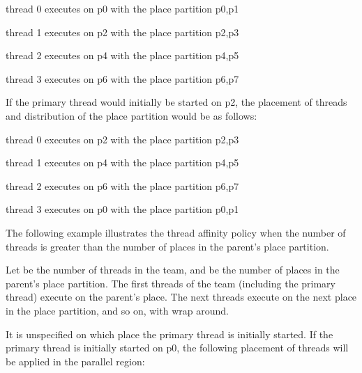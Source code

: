 \begin{compactitem}
\item thread 0 executes on p0 with the place partition p0,p1

\item thread 1 executes on p2 with the place partition p2,p3

\item thread 2 executes on p4 with the place partition p4,p5

\item thread 3 executes on p6 with the place partition p6,p7
\end{compactitem}


If the primary thread would initially be started on p2, the placement of threads 
and distribution of the place partition would be as follows:

\begin{compactitem}
\item thread 0 executes on p2 with the place partition p2,p3

\item thread 1 executes on p4 with the place partition p4,p5

\item thread 2 executes on p6 with the place partition p6,p7

\item thread 3 executes on p0 with the place partition p0,p1
\end{compactitem}

The following example illustrates the  thread affinity policy when 
the number of threads is greater than the number of places in the parent's place 
partition.

Let  be the number of threads in the team, and  be the number of places in the 
parent's place partition. The first  threads of the team (including the primary
thread) execute on the parent's place. The next  threads execute on the next 
place in the place partition, and so on, with wrap around. 



It is unspecified on which place the primary thread is initially started. If the 
primary thread is initially started on p0, the following placement of threads will 
be applied in the parallel region:

